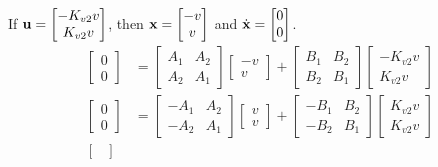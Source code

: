 If $\mathbf{u} =
\begin{bmatrix}
  -K_{v2} v \\
  K_{v2} v
\end{bmatrix}$, then $\mathbf{x} =
\begin{bmatrix}
  -v \\
  v
\end{bmatrix}$ and $\dot{\mathbf{x}} =
\begin{bmatrix}
  0 \\
  0
\end{bmatrix}$.
\begin{align*}
  \begin{bmatrix}
    0 \\
    0
  \end{bmatrix} &=
    \begin{bmatrix}
      A_1 & A_2 \\
      A_2 & A_1
    \end{bmatrix}
    \begin{bmatrix}
      -v \\
      v
    \end{bmatrix} +
    \begin{bmatrix}
      B_1 & B_2 \\
      B_2 & B_1
    \end{bmatrix}
    \begin{bmatrix}
      -K_{v2} v \\
      K_{v2} v
    \end{bmatrix} \\
  \begin{bmatrix}
    0 \\
    0
  \end{bmatrix} &=
    \begin{bmatrix}
      -A_1 & A_2 \\
      -A_2 & A_1
    \end{bmatrix}
    \begin{bmatrix}
      v \\
      v
    \end{bmatrix} +
    \begin{bmatrix}
      -B_1 & B_2 \\
      -B_2 & B_1
    \end{bmatrix}
    \begin{bmatrix}
      K_{v2} v \\
      K_{v2} v
    \end{bmatrix} \\
  \begin{bmatrix}

\end{bmatrix}
\end{align*}
